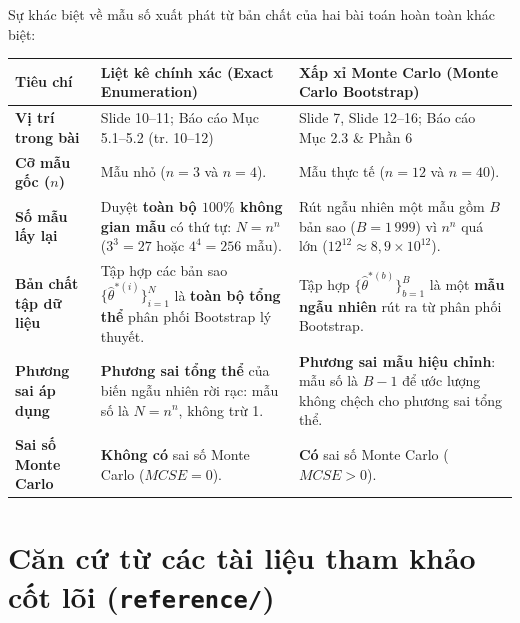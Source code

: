 \documentclass[10pt,a4paper]{article}
\begin{document}
Sự khác biệt về mẫu số xuất phát từ bản chất của hai bài toán hoàn toàn khác biệt:

\vspace{0.2cm}
\noindent
\begin{tabular}{|>{\RaggedRight\arraybackslash}p{2.6cm}|>{\RaggedRight\arraybackslash}p{7.0cm}|>{\RaggedRight\arraybackslash}p{7.0cm}|}
\hline
\rowcolor{headerbg}
\textbf{Tiêu chí} & \textbf{Liệt kê chính xác (Exact Enumeration)} & \textbf{Xấp xỉ Monte Carlo (Monte Carlo Bootstrap)} \\
\hline
\textbf{Vị trí trong bài} & Slide 10--11; Báo cáo Mục 5.1--5.2 (tr. 10--12) & Slide 7, Slide 12--16; Báo cáo Mục 2.3 \& Phần 6 \\
\hline
\textbf{Cỡ mẫu gốc ($n$)} & Mẫu nhỏ ($n=3$ và $n=4$). & Mẫu thực tế ($n=12$ và $n=40$). \\
\hline
\textbf{Số mẫu lấy lại} & Duyệt \textbf{toàn bộ $100\%$ không gian mẫu} có thứ tự: $N = n^n$ ($3^3 = 27$ hoặc $4^4 = 256$ mẫu). & Rút ngẫu nhiên một mẫu gồm $B$ bản sao ($B = 1\,999$) vì $n^n$ quá lớn ($12^{12} \approx 8{,}9 \times 10^{12}$). \\
\hline
\textbf{Bản chất tập dữ liệu} & Tập hợp các bản sao $\{\hat\theta^{*(i)}\}_{i=1}^N$ là \textbf{toàn bộ tổng thể} phân phối Bootstrap lý thuyết. & Tập hợp $\{\hat\theta^{*(b)}\}_{b=1}^B$ là một \textbf{mẫu ngẫu nhiên} rút ra từ phân phối Bootstrap. \\
\hline
\textbf{Phương sai áp dụng} & \textbf{Phương sai tổng thể} của biến ngẫu nhiên rời rạc: mẫu số là \textbf{$N = n^n$}, không trừ 1. & \textbf{Phương sai mẫu hiệu chỉnh}: mẫu số là \textbf{$B - 1$} để ước lượng không chệch cho phương sai tổng thể. \\
\hline
\textbf{Sai số Monte Carlo} & \textbf{Không có} sai số Monte Carlo ($MCSE = 0$). & \textbf{Có} sai số Monte Carlo ($MCSE > 0$). \\
\hline
\end{tabular}
\vspace{0.3cm}

\section{Căn cứ từ các tài liệu tham khảo cốt lõi (\texttt{reference/})}
\end{document}
